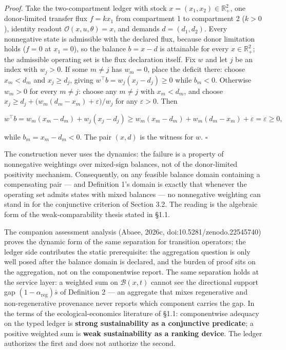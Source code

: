 \documentclass[11pt]{article}
\begin{document}
\emph{Proof.} Take the two-compartment ledger with stock \(x =\allowbreak{} (x_1,\allowbreak{} x_2) \in \mathbb{R}^2_+\allowbreak{}\), one donor-limited transfer flux \(f = kx_1\) from compartment 1 to compartment 2 (\(k > 0\)), identity readout \(\mathcal{O}(x, u, \theta) = x\), and demands \(d = (d_1, d_2)\). Every nonnegative state is admissible with the declared flux, because donor limitation holds (\(f = 0\) at \(x_1 = 0\)), so the balance \(b = x - d\) is attainable for every \(x \in \mathbb{R}^2_+\); the admissible operating set is the flux declaration itself. Fix \(w\) and let \(j\) be an index with \(w_j > 0\). If some \(m \neq j\) has \(w_m = 0\), place the deficit there: choose \(x_m < d_m\) and \(x_j \ge d_j\), giving \(w^\top b =\allowbreak{} w_j (x_j - d_j) \ge 0\) while \(b_m < 0\). Otherwise \(w_m > 0\) for every \(m \neq j\): choose any \(m \neq j\) with \(x_m < d_m\), and choose \(x_j \ge d_j +\allowbreak{} \bigl( w_m (d_m - x_m) +\allowbreak{} \varepsilon \bigr)/w_j\) for any \(\varepsilon > 0\). Then 

$$w^\top b = w_m (x_m - d_m) + w_j (x_j - d_j) \ge w_m (x_m - d_m) + w_m (d_m - x_m) + \varepsilon = \varepsilon \ge 0,$$

 while \(b_m = x_m - d_m < 0\). The pair \((x, d)\) is the witness for \(w\). \(\square\)

The construction never uses the dynamics: the failure is a property of nonnegative weightings over mixed-sign balances, not of the donor-limited positivity mechanism. Consequently, on any feasible balance domain containing a compensating pair --- and Definition 1's domain is exactly that whenever the operating set admits states with mixed balances --- no nonnegative weighting can stand in for the conjunctive criterion of Section 3.2. The reading is the algebraic form of the weak-comparability thesis stated in \S1.1.

The companion assessment analysis (Abaee, 2026c, doi:10.5281/\allowbreak{}zenodo.22545740) proves the dynamic form of the same separation for transition operators; the ledger side contributes the static prerequisite: the aggregation question is only well posed after the balance domain is declared, and the burden of proof sits on the aggregation, not on the componentwise report. The same separation holds at the service layer: a weighted sum on \(\mathcal{B}(x,t)\) cannot see the directional support gap \((1 - \alpha_{\mathrm{reg}})\bar s\) of Definition 2 --- an aggregate that mixes regenerative and non-regenerative provenance never reports which component carries the gap. In the terms of the ecological-economics literature of \S1.1: componentwise adequacy on the typed ledger is \textbf{strong sustainability as a conjunctive predicate}; a positive weighted sum is \textbf{weak sustainability as a ranking device}. The ledger authorizes the first and does not authorize the second.
\end{document}
